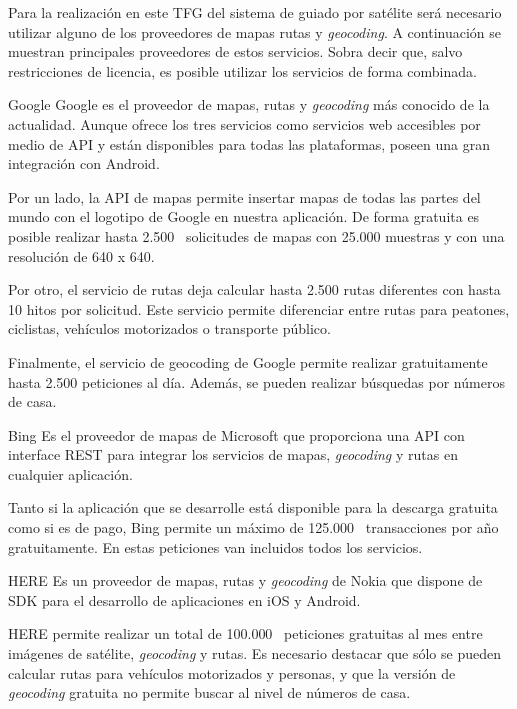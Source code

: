 Para la realización en este \acs{TFG} del sistema de guiado por satélite será necesario utilizar
alguno de los proveedores de mapas rutas y \emph{geocoding}. A continuación se muestran principales
proveedores de estos servicios. Sobra decir que, salvo restricciones de licencia, es posible
utilizar los servicios de forma combinada.

\begin{definitionlist}
  \item[Google] Google es el proveedor de mapas, rutas y \emph{geocoding} más conocido de la
    actualidad. Aunque ofrece los tres servicios como servicios web accesibles por medio de
    \acs{API} y están disponibles para todas las plataformas, poseen una gran integración con
    Android.

    Por un lado, la \acs{API} de mapas permite insertar mapas de todas las partes del mundo con el
    logotipo de Google en nuestra aplicación. De forma gratuita es posible realizar hasta
    2.500~\cite{LicenciaAndroid} solicitudes de mapas con 25.000 muestras y con una resolución de
    640 x 640.

    Por otro, el servicio de rutas deja calcular hasta 2.500 rutas diferentes con hasta 10
    hitos por solicitud. Este servicio permite diferenciar entre rutas para peatones, ciclistas,
    vehículos motorizados o transporte público.

    Finalmente, el servicio de geocoding de Google permite realizar gratuitamente hasta 2.500
    peticiones al día. Además, se pueden realizar búsquedas por números de casa.

  \item[Bing] Es el proveedor de mapas de Microsoft que proporciona una \acs{API} con interface
    \acf{REST} para integrar los servicios de mapas, \emph{geocoding} y rutas en cualquier
    aplicación.

    Tanto si la aplicación que se desarrolle está disponible para la descarga gratuita como si es de
    pago, Bing permite un máximo de 125.000~\cite{LicenciaMicrosoft} transacciones por año
    gratuitamente. En estas peticiones van incluidos todos los servicios.

  \item[HERE] Es un proveedor de mapas, rutas y \emph{geocoding} de Nokia que dispone de \acf{SDK}
    para el desarrollo de aplicaciones en iOS y Android.

    HERE permite realizar un total de 100.000~\cite{LicenciaHERE} peticiones gratuitas al mes entre
    imágenes de satélite, \emph{geocoding} y rutas. Es necesario destacar que sólo se pueden
    calcular rutas para vehículos motorizados y personas, y que la versión de \emph{geocoding}
    gratuita no permite buscar al nivel de números de casa.


\end{definitionlist}
